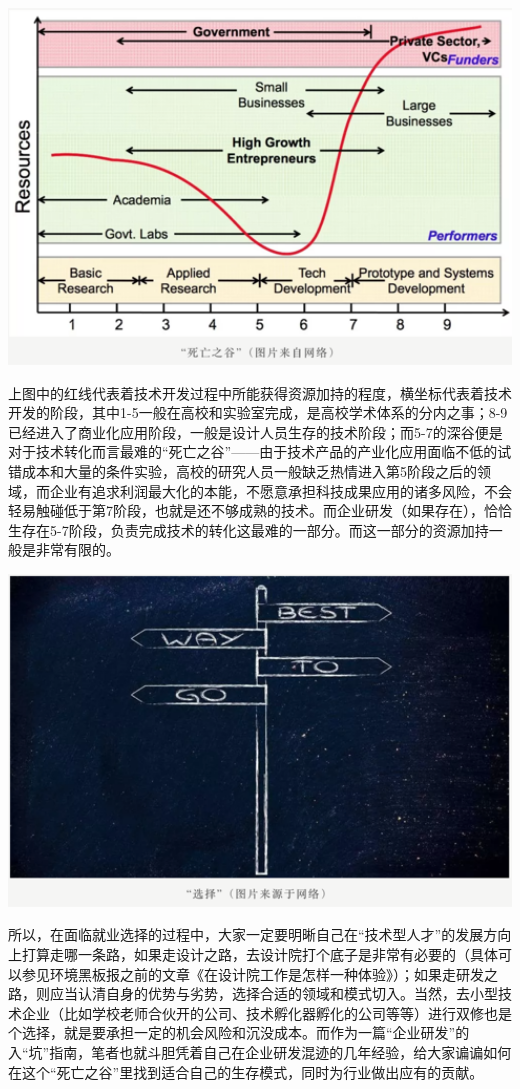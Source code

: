 \documentclass[]{book}
\begin{document}
\includegraphics[width=6.67in]{images/qiye3}

上图中的红线代表着技术开发过程中所能获得资源加持的程度，横坐标代表着技术开发的阶段，其中1-5一般在高校和实验室完成，是高校学术体系的分内之事；8-9已经进入了商业化应用阶段，一般是设计人员生存的技术阶段；而5-7的深谷便是对于技术转化而言最难的``死亡之谷''------由于技术产品的产业化应用面临不低的试错成本和大量的条件实验，高校的研究人员一般缺乏热情进入第5阶段之后的领域，而企业有追求利润最大化的本能，不愿意承担科技成果应用的诸多风险，不会轻易触碰低于第7阶段，也就是还不够成熟的技术。而企业研发（如果存在），恰恰生存在5-7阶段，负责完成技术的转化这最难的一部分。而这一部分的资源加持一般是非常有限的。

\includegraphics[width=6.67in]{images/qiye4}

所以，在面临就业选择的过程中，大家一定要明晰自己在``技术型人才''的发展方向上打算走哪一条路，如果走设计之路，去设计院打个底子是非常有必要的（具体可以参见环境黑板报之前的文章《在设计院工作是怎样一种体验》）；如果走研发之路，则应当认清自身的优势与劣势，选择合适的领域和模式切入。当然，去小型技术企业（比如学校老师合伙开的公司、技术孵化器孵化的公司等等）进行双修也是个选择，就是要承担一定的机会风险和沉没成本。而作为一篇``企业研发''的入``坑''指南，笔者也就斗胆凭着自己在企业研发混迹的几年经验，给大家谝谝如何在这个``死亡之谷''里找到适合自己的生存模式，同时为行业做出应有的贡献。
\end{document}
